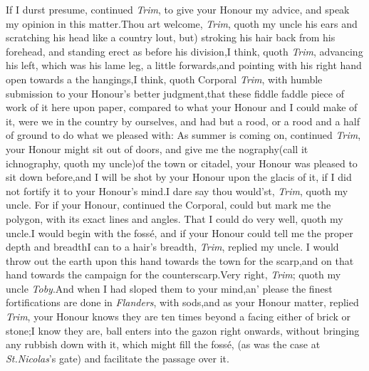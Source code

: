 \documentclass{article}
\begin{document}
If I durst presume, continued \textit{Trim}, 
to give your Honour my advice, and\break
speak my opinion in this matter.\tsk Thou\break
art welcome, \textit{Trim}, quoth my uncle\break
{}
his ears and scratching his head like a
country lout, but) stroking his hair back from his forehead, and
standing erect as before his division,\tsh I think, quoth
\textit{Trim}, advancing his left, which was his lame leg, a little
forwards,\tsk and pointing with his right hand open towards
a\break
{}
the
hangings,\tsh I think, quoth Corporal \textit{Trim}, with
humble submission to your Honour’s better
judgment,\tsh that these\pb
{}
fiddle faddle piece of work of it here\break
upon paper, compared to what your Honour and I
could make of it, were we in the country by ourselves, and had but a
rood, or a rood and a half of ground to do what we pleased with: As
summer is coming on, continued \textit{Trim}, your Honour might sit out
of doors, and give me\break
the nography\tsh (call it ichnography,
quoth my uncle)\tsk of the town or cita\-del, your Honour
was pleased to sit down before,\tsk and I will be shot by your
Honour upon the glacis of it, if I did not fortify it to your
Honour’s mind.\tsh I dare say thou would’st,
\textit{Trim}, quoth my uncle.\break
\tsk For if your Honour, continued the 
Corporal, could but mark me the polygon,
with its exact lines and angles.\tsk\break
That I could do very well, quoth my\pb 
uncle.\tsk I would begin with the fossé,\break
and if your Honour
could tell me the proper depth and breadth\tsk I can to a
hair’s breadth, \textit{Trim}, replied my uncle.\tsk\break
I would
throw out the earth upon this hand towards the town for the
scarp,\tsk\break and on that hand towards the campaign for the
counterscarp.\tsk Very right, \textit{Trim}; quoth my uncle
\textit{Toby}.\tsk And when I had sloped them to your
mind,\tsh an’ please 
the finest fortifications are done in \textit{Flan\-ders},
with sods,\tsk and as your Honour
matter, replied \textit{Trim}, your Honour knows
they are ten times beyond a facing either
of brick or stone;\tsh I know they are,\pb
{}
ball enters into the gazon right onwards, 
without bringing any rubbish down with
it, which might fill the fossé, (as was the
case at \textit{St.\@ Nicolas}’s gate) and facilitate\break
the passage over it.
\end{document}
